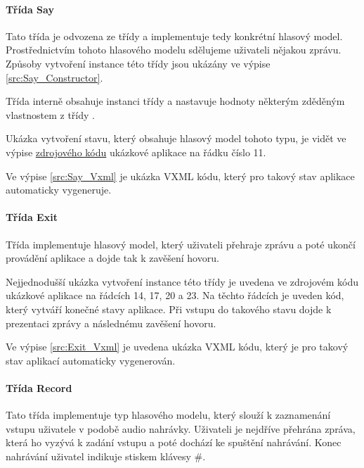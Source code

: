 \documentclass[ing,male,java,dept460]{diploma}						%
\begin{document}
\paragraph{Třída Say}
\label{sec:Say}
Tato třída je odvozena ze třídy  a implementuje tedy konkrétní hlasový model. Prostřednictvím tohoto hlasového modelu sdělujeme uživateli nějakou zprávu. Způsoby vytvoření instance této třídy jsou ukázány ve výpise \ref{src:Say_Constructor}.



Třída  interně obsahuje instanci třídy  a nastavuje hodnoty některým zděděným vlastnostem z třídy .

Ukázka vytvoření stavu, který obsahuje hlasový model tohoto typu, je vidět ve výpise \hyperref[src:MenuExample]{zdrojového kódu} ukázkové aplikace na řádku číslo 11.

Ve výpise \ref{src:Say_Vxml} je ukázka VXML kódu, který pro takový stav aplikace automaticky vygeneruje.



\paragraph{Třída Exit}
\label{sec:Exit}
Třída  implementuje hlasový model, který uživateli přehraje zprávu a poté ukončí provádění aplikace a dojde tak k zavěšení hovoru.

Nejjednodušší ukázka vytvoření instance této třídy je uvedena ve zdrojovém kódu ukázkové aplikace na řádcích 14, 17, 20 a 23. Na těchto řádcích je uveden kód, který vytváří konečné stavy aplikace. Při vstupu do takového stavu dojde k prezentaci zprávy a následnému zavěšení hovoru.

Ve výpise \ref{src:Exit_Vxml} je uvedena ukázka VXML kódu, který je pro takový stav aplikací automaticky vygenerován.



\paragraph{Třída Record}
\label{sec:Record}
Tato třída implementuje typ hlasového modelu, který slouží k zaznamenání vstupu uživatele v podobě audio nahrávky. Uživateli je nejdříve přehrána zpráva, která ho vyzývá k zadání vstupu a poté dochází ke spuštění nahrávání. Konec nahrávání uživatel indikuje stiskem klávesy \#.
\end{document}
